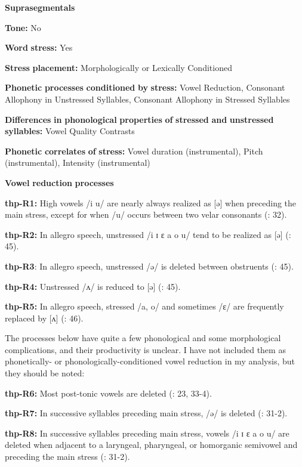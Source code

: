 \begin{styleBody}
\textbf{Suprasegmentals}

\textbf{Tone:} No

\textbf{Word} \textbf{stress:} Yes

\textbf{Stress} \textbf{placement:} Morphologically or Lexically Conditioned

\textbf{Phonetic} \textbf{processes} \textbf{conditioned} \textbf{by} \textbf{stress:} Vowel Reduction, Consonant Allophony in Unstressed Syllables, Consonant Allophony in Stressed Syllables

\textbf{Differences} \textbf{in} \textbf{phonological} \textbf{properties} \textbf{of} \textbf{stressed} \textbf{and} \textbf{unstressed} \textbf{syllables:} Vowel Quality Contrasts

\textbf{Phonetic} \textbf{correlates} \textbf{of} \textbf{stress:} Vowel duration (instrumental), Pitch (instrumental), Intensity (instrumental)

\textbf{Vowel} \textbf{reduction} \textbf{processes}

\textbf{thp-R1:} High vowels /i u/ are nearly always realized as [ə] when preceding the main stress, except for when /u/ occurs between two velar consonants (\citealt{ThompsonThompson1992}: 32).

\textbf{thp-R2:} In allegro speech, unstressed /i ɪ ɛ a o u/ tend to be realized as [ə] (\citealt{ThompsonThompson1992}: 45).

\textbf{thp-R3}: In allegro speech, unstressed /ə/ is deleted between obstruents (\citealt{ThompsonThompson1992}: 45).

\textbf{thp-R4:} Unstressed /ʌ/ is reduced to [ə] (\citealt{ThompsonThompson1992}: 45).

\textbf{thp-R5:} In allegro speech, stressed /a, o/ and sometimes /ɛ/ are frequently replaced by [ʌ] (\citealt{ThompsonThompson1992}: 46).

The processes below have quite a few phonological and some morphological complications, and their productivity is unclear. I have not included them as phonetically- or phonologically-conditioned vowel reduction in my analysis, but they should be noted:

\textbf{thp-R6:} Most post-tonic vowels are deleted (\citealt{ThompsonThompson1992}: 23, 33-4).

\textbf{thp-R7:} In successive syllables preceding main stress, /ə/ is deleted (\citealt{ThompsonThompson1992}: 31-2).

\textbf{thp-R8:} In successive syllables preceding main stress, vowels /i ɪ ɛ a o u/ are deleted when adjacent to a laryngeal, pharyngeal, or homorganic semivowel and preceding the main stress (\citealt{ThompsonThompson1992}: 31-2).


\end{styleBody}
